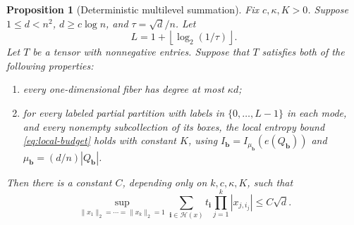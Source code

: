 \documentclass[11pt,reqno]{amsart}
\numberwithin{equation}{section}
\newtheorem{proposition}[theorem]{Proposition}
\theoremstyle{definition}
\theoremstyle{remark}
\begin{document}
\begin{proposition}[Deterministic multilevel summation]\label{prop:heavy}
Fix $c,\kappa,K>0$. Suppose $1\le d<n^2$, $d\ge c\log n$, and
$\tau=\sqrt d/n$. Let
\begin{equation}\label{eq:L}
 L=1+\left\lfloor\log_2(1/\tau)\right\rfloor.
\end{equation}
Let $T$ be a tensor with nonnegative entries.
Suppose that $T$ satisfies both of the following properties:
\begin{enumerate}[label=(\roman*),leftmargin=*]
\item every one-dimensional fiber has degree at most $\kappa d$;
\item for every labeled partial partition with labels in $\{0,\ldots,L-1\}$
      in each mode, and every nonempty subcollection of its boxes, the local
      entropy bound \eqref{eq:local-budget} holds with constant $K$,
      using $I_{\mathbf{b}}=I_{\mu_{\mathbf{b}}}(e(Q_{\mathbf{b}}))$ and $\mu_{\mathbf{b}}=(d/n)|Q_{\mathbf{b}}|$.
\end{enumerate}
Then there is a constant $C$, depending only on $k,c,\kappa,K$, such that
\[
 \sup_{\|x_1\|_2=\cdots=\|x_k\|_2=1}
 \sum_{\mathbf i\in\mathcal H(x)}
       t_{\mathbf i}\prod_{j=1}^k|x_{j,i_j}|
 \le C\sqrt d.
\]
\end{proposition}
\end{document}
